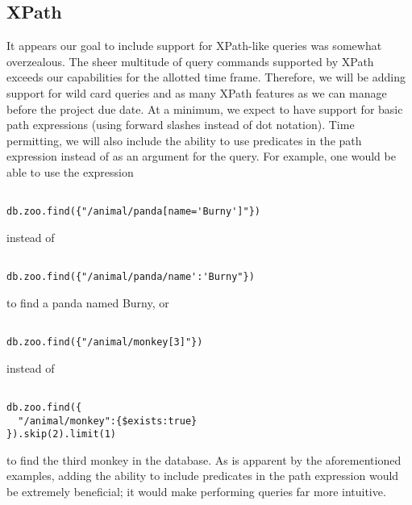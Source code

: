 \documentclass{dependencies/acm_proc_article-sp}
\begin{document}
\subsection{XPath}
It appears our goal to include support for XPath-like queries was somewhat
overzealous. The sheer multitude of query commands supported by XPath
exceeds our capabilities for the allotted time frame. Therefore, we will be
adding support for wild card queries and as many XPath features as we can
manage before the project due date. At a minimum, we expect to have support
for basic path expressions (using forward slashes instead of dot notation).
Time permitting, we will also include the ability to use predicates in the
path expression instead of as an argument for the query. For example, one
would be able to use the expression
\begin{lstlisting}

db.zoo.find({"/animal/panda[name='Burny']"})
\end{lstlisting}
instead of
\begin{lstlisting}

db.zoo.find({"/animal/panda/name':'Burny"})
\end{lstlisting}
to find a panda named Burny, or
\begin{lstlisting}

db.zoo.find({"/animal/monkey[3]"})
\end{lstlisting}
instead of
\begin{lstlisting}

db.zoo.find({
  "/animal/monkey":{$exists:true}
}).skip(2).limit(1)
\end{lstlisting}
to find the
third monkey in the database. As is apparent by the aforementioned
examples, adding the ability to include predicates in the path expression
would be extremely beneficial; it would make performing queries far more
intuitive.




\newpage
%

%
%
\balancecolumns
\end{document}
